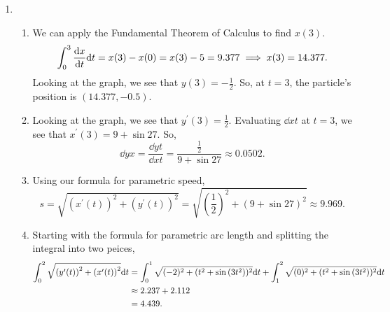 \begin{enumerate}
	\item \begin{enumerate}
		\item We can apply the Fundamental Theorem of Calculus to find $x(3)$.
			\begin{equation*}
				\int_{0}^{3}{\frac{\mathrm{d} x}{\mathrm{d} t}\mathrm{d} t} = x(3) - x(0) = x(3) - 5 = 9.377 \implies x(3) = 14.377.
			\end{equation*}
			Looking at the graph, we see that $y(3)=-\frac{1}{2}$.
			So, at $t=3$, the particle's position is $\left(14.377, -0.5\right)$.
		\item Looking at the graph, we see that $y^\prime(3) = \frac{1}{2}$.
			Evaluating $\dd{x}{t}$ at $t=3$, we see that $x^\prime(3) = 9+\sin{27}$.
			So,
			\begin{equation*}
				\dd{y}{x} = \frac{\dd{y}{t}}{\dd{x}{t}} = \frac{\frac{1}{2}}{9+\sin{27}} \approx 0.0502.
			\end{equation*}
		\item Using our formula for parametric speed,
			\begin{equation*}
				s = \sqrt{(x^\prime(t))^2 + (y^\prime(t))^2} = \sqrt{\left(\frac{1}{2}\right)^2 + \left(9+\sin{27}\right)^2} \approx 9.969.
			\end{equation*}
		\item Starting with the formula for parametric arc length and splitting the integral into two peices,
			\begin{align*}
				\int_{0}^{2}{\sqrt{\left(y^\prime(t)\right)^2+\left(x^\prime(t)\right)^2}\mathrm{d} t} &= \int_{0}^{1}{\sqrt{(-2)^2+(t^2+\sin{(3t^2)})^2}\mathrm{d} t} + \int_{1}^{2}{\sqrt{(0)^2+(t^2+\sin{(3t^2)})^2}\mathrm{d} t} \\
				&\approx 2.237 + 2.112 \\
				&= 4.439.
			\end{align*}
	\end{enumerate}


\end{enumerate}
